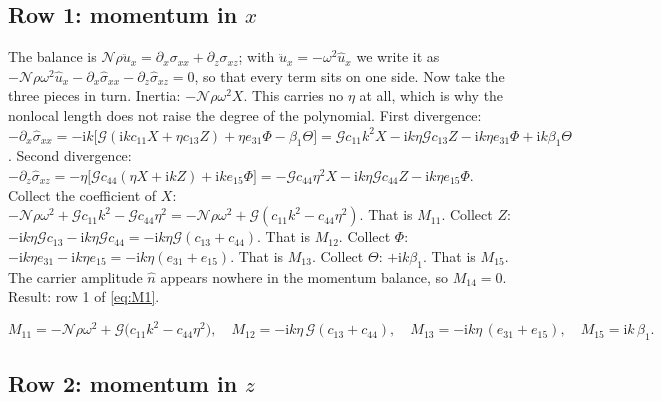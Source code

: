 \documentclass[11pt]{article}
\makeatletter
\newif\ifshowworked
\newenvironment{worked}{%
  \ifshowworked\par\smallskip\noindent\textit{Working.}\par\smallskip\else
  \setbox\z@\vbox\bgroup\fi}{\ifshowworked\par\smallskip\else\egroup\fi}
\newcommand{\ii}{\mathrm{i}}
\newcommand{\Ncal}{\mathcal{N}}
\newcommand{\Gcal}{\mathcal{G}}
\makeatother
\begin{document}
\subsection*{Row 1: momentum in $x$}

\begin{worked}
The balance is $\Ncal\rho\ddot u_x=\partial_x\sigma_{xx}+\partial_z\sigma_{xz}$; with
$\ddot u_x=-\omega^2\hat u_x$ we write it as
$-\Ncal\rho\omega^2\hat u_x-\partial_x\hat\sigma_{xx}-\partial_z\hat\sigma_{xz}=0$, so that every term
sits on one side. Now take the three pieces in turn.
Inertia: $-\Ncal\rho\omega^2X$. This carries no $\eta$ at all, which is why the nonlocal length does not
raise the degree of the polynomial.
First divergence: $-\partial_x\hat\sigma_{xx}=-\ii k\bigl[\Gcal(\ii kc_{11}X+\eta c_{13}Z)
+\eta e_{31}\Phi-\beta_1\Theta\bigr]
=\Gcal c_{11}k^2X-\ii k\eta\Gcal c_{13}Z-\ii k\eta e_{31}\Phi+\ii k\beta_1\Theta$.
Second divergence: $-\partial_z\hat\sigma_{xz}=-\eta\bigl[\Gcal c_{44}(\eta X+\ii kZ)
+\ii k e_{15}\Phi\bigr]=-\Gcal c_{44}\eta^2X-\ii k\eta\Gcal c_{44}Z-\ii k\eta e_{15}\Phi$.
Collect the coefficient of $X$: $-\Ncal\rho\omega^2+\Gcal c_{11}k^2-\Gcal c_{44}\eta^2
=-\Ncal\rho\omega^2+\Gcal(c_{11}k^2-c_{44}\eta^2)$. That is $M_{11}$.
Collect $Z$: $-\ii k\eta\Gcal c_{13}-\ii k\eta\Gcal c_{44}=-\ii k\eta\Gcal(c_{13}+c_{44})$.
That is $M_{12}$.
Collect $\Phi$: $-\ii k\eta e_{31}-\ii k\eta e_{15}=-\ii k\eta(e_{31}+e_{15})$. That is $M_{13}$.
Collect $\Theta$: $+\ii k\beta_1$. That is $M_{15}$.
The carrier amplitude $\hat n$ appears nowhere in the momentum balance, so $M_{14}=0$.
Result: row 1 of \eqref{eq:M1}.
\end{worked}

\begin{equation}\label{eq:M1}
M_{11}=-\Ncal\rho\omega^2+\Gcal\bigl(c_{11}k^2-c_{44}\eta^2\bigr),\quad
M_{12}=-\ii k\eta\,\Gcal(c_{13}+c_{44}),\quad
M_{13}=-\ii k\eta\,(e_{31}+e_{15}),\quad
M_{15}=\ii k\,\beta_1 .
\end{equation}

\subsection*{Row 2: momentum in $z$}
\end{document}
